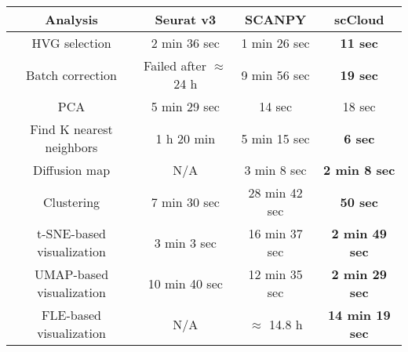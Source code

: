 \documentclass[10pt]{article}
\begin{document}
\begin{table}[H]
	\centering
	\begin{tabular}{|c|c|c|c|}
		\hline
		Analysis & Seurat v3 & SCANPY & scCloud\\
		\hline \hline
		HVG selection & 2 min 36 sec & 1 min 26 sec & \textbf{11 sec} \\
		\hline
		Batch correction & Failed after $\approx$ 24 h & 9 min 56 sec & \textbf{19 sec} \\
		\hline
		PCA & 5 min 29 sec & 14 sec & 18 sec \\
		\hline
		Find K nearest neighbors &  1 h 20 min &  5 min 15 sec & \textbf{6 sec}\\
		\hline
		Diffusion map & N/A & 3 min 8 sec & \textbf{2 min 8 sec} \\
		\hline 
		Clustering & 7 min 30 sec & 28 min 42 sec & \textbf{50 sec}\\
		\hline
		t-SNE-based visualization & 3 min 3 sec & 16 min 37 sec & \textbf{2 min 49 sec}\\
		\hline
		UMAP-based visualization & 10 min 40 sec & 12 min 35 sec & \textbf{2 min 29 sec}\\
		\hline
		FLE-based visualization & N/A & $\approx$ 14.8  h & \textbf{14 min 19 sec}\\
		\hline
	\end{tabular}
\end{table}
\end{document}
